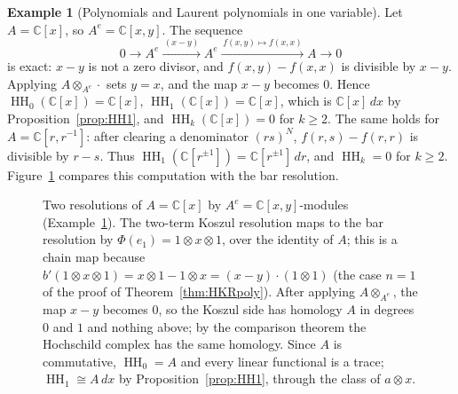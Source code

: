 \documentclass[11pt,oneside,reqno]{article}
\DeclareMathOperator{\HH}{HH}
\newcommand{\C}{\mathbb C}
\theoremstyle{plain}
\theoremstyle{definition}
\newtheorem{example}[theorem]{Example}
\theoremstyle{remark}
\begin{document}
\begin{example}[Polynomials and Laurent polynomials in one variable]
\label{ex:Cx}
Let \(A=\C[x]\), so \(A^e=\C[x,y]\). The sequence
\[
 0\to A^e\xrightarrow{\,(x-y)\,}A^e\xrightarrow{\,f(x,y)\mapsto f(x,x)\,}A\to0
\]
is exact: \(x-y\) is not a zero divisor, and \(f(x,y)-f(x,x)\) is divisible by
\(x-y\). Applying \(A\otimes_{A^e}\cdot\) sets \(y=x\), and the map \(x-y\)
becomes \(0\). Hence \(\HH_0(\C[x])=\C[x]\), \(\HH_1(\C[x])=\C[x]\), which is
\(\C[x]\,dx\) by Proposition~\ref{prop:HH1}, and \(\HH_k(\C[x])=0\) for \(k\ge2\).
The same holds for \(A=\C[r,r^{-1}]\): after clearing a denominator
\((rs)^N\), \(f(r,s)-f(r,r)\) is divisible by \(r-s\). Thus
\(\HH_1(\C[r^{\pm1}])=\C[r^{\pm1}]\,dr\), and \(\HH_k=0\) for \(k\ge2\).
Figure~\ref{fig:Cx} compares this computation with the bar resolution.
\end{example}

\begin{figure}[htbp]
\centering
{}
\caption[{\(\HH_*(\C[x])\): Koszul versus bar}]{Two resolutions of \(A=\C[x]\) by
\(A^e=\C[x,y]\)-modules (Example~\ref{ex:Cx}). The two-term Koszul resolution
maps to the bar resolution by \(\Phi(e_1)=1\otimes x\otimes1\), over the identity
of \(A\); this is a chain map because \(b'(1\otimes x\otimes1)=x\otimes1-1\otimes x=(x-y)\cdot(1\otimes1)\)
(the case \(n=1\) of the proof of Theorem~\ref{thm:HKRpoly}). After applying
\(A\otimes_{A^e}\), the map \(x-y\) becomes \(0\), so the Koszul side has homology \(A\) in
degrees \(0\) and \(1\) and nothing above; by the comparison theorem the Hochschild
complex has the same homology. Since \(A\) is commutative, \(\HH_0=A\) and every
linear functional is a trace; \(\HH_1\cong A\,dx\) by
Proposition~\ref{prop:HH1}, through the class of \(a\otimes x\).}
\label{fig:Cx}
\end{figure}
\end{document}
